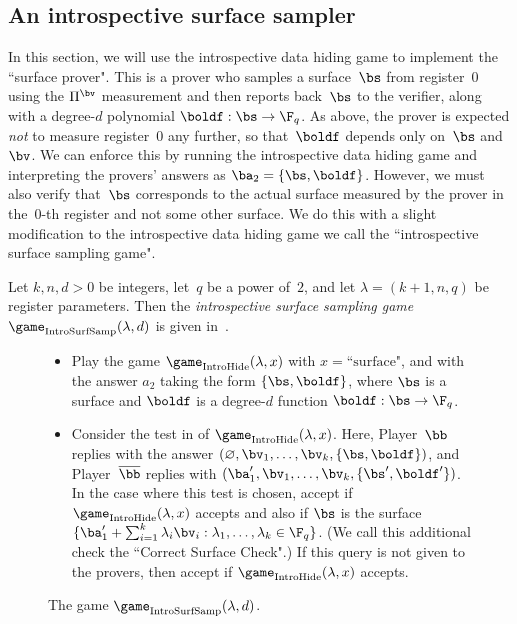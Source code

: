 \subsection{An introspective surface sampler}

In this section, we will use the introspective data hiding game
to implement the ``surface prover".
This is a prover who samples a surface~$\bs$ from register~$0$ using the $\Pi^{\bv}$ measurement
and then reports back~$\bs$ to the verifier, along with a degree-$d$ polynomial $\boldf:\bs \rightarrow \F_q$.
As above, the prover is expected \emph{not} to measure register~$0$ any further, so that~$\boldf$ depends only on~$\bs$ and~$\bv$.
We can enforce this by running the introspective data hiding game and interpreting the provers' answers as $\ba_2 = \{\bs, \boldf\}$.
However, we must also verify that~$\bs$ corresponds to the actual surface measured by the prover in the~$0$-th register
and not some other surface.
We do this with a slight modification to the introspective data hiding game we call the ``introspective surface sampling game".

\begin{definition}
Let $k, n, d>0$ be integers, let~$q$ be a power of~$2$,
and let $\lambda = (k+1, n, q)$ be register parameters.
Then the \emph{introspective surface sampling game}~$\game_{\mathrm{IntroSurfSamp}}(\lambda, d)$ is given in~.
\end{definition}

{
\begin{figure}[htbp]
  \begin{itemize}
  \item[$\circ$] Play the game $\game_{\mathrm{IntroHide}}(\lambda, x)$ with $x =
    \text{``surface"}$, and with the answer $a_2$ taking the form
    $\{\bs,\boldf\}$, where $\bs$ is a surface and
                  $\boldf$ is a degree-$d$ function $\boldf:\bs\rightarrow \F_q$.
  \item[$\circ$] Consider the test in  of $\game_{\mathrm{IntroHide}}(\lambda, x)$.
  	Here, Player~$\bb$ replies with the answer
		$(\varnothing, \bv_1, \ldots, \bv_k, \{\bs, \boldf\})$,
		and Player~$\overline{\bb}$ replies with
		$(\ba_1', \bv_1, \ldots, \bv_k, \{\bs', \boldf'\})$.
   In the case where this test is chosen, accept if $\game_{\mathrm{IntroHide}}(\lambda, x)$ accepts and also if
   $\bs$ is the surface $\{\ba_1' +
    \sum_{i=1}^{k} \lambda_i \bv_i : \lambda_1,
    \dots, \lambda_k \in \F_q\}$.
    (We call this additional check the ``Correct Surface Check".)
    If this query is not given to the
    provers, then accept if $\game_{\mathrm{IntroHide}}(\lambda, x)$ accepts.
  \end{itemize}
  \caption{The game $\game_{\mathrm{IntroSurfSamp}}(\lambda,d)$.\label{fig:big-plane}}
\end{figure}
}

